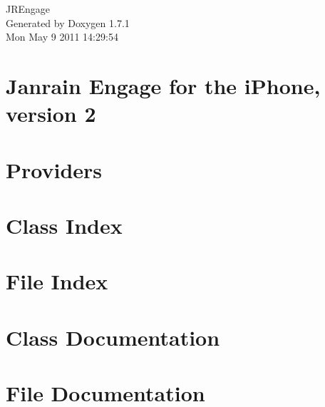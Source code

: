 \documentclass[a4paper]{book}
\begin{document}
\hypersetup{pageanchor=false}
\begin{titlepage}
\vspace*{7cm}
\begin{center}
{\Large JREngage }\\
\vspace*{1cm}
{\large Generated by Doxygen 1.7.1}\\
\vspace*{0.5cm}
{\small Mon May 9 2011 14:29:54}\\
\end{center}
\end{titlepage}
\clearemptydoublepage
{}
\tableofcontents
\clearemptydoublepage
{}
\hypersetup{pageanchor=true}
\chapter{Janrain Engage for the iPhone, version 2}
\label{index}\hypertarget{index}{}
\chapter{Providers}
\label{Providers}
\hypertarget{Providers}{}

\chapter{Class Index}

\chapter{File Index}

\chapter{Class Documentation}









\chapter{File Documentation}

\printindex
\end{document}
